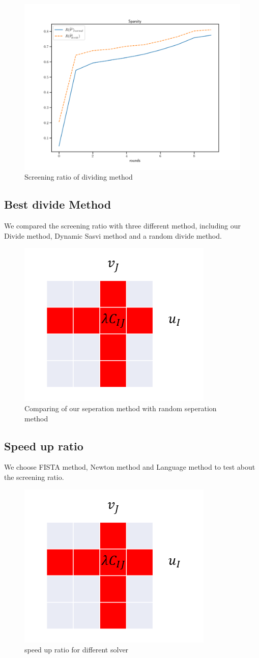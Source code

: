 	\begin{figure}[htbp]
	\begin{center}	
	\includegraphics[width=0.4\hsize]{pic/screening_divide_ratio_long}
	\caption{Screening ratio of dividing method}
	\end{center}	
	\end{figure}

\subsection{Best divide Method}
We compared the screening ratio with three different method, including our Divide method, Dynamic Sasvi method and a random divide method.
	\begin{figure}[htbp]
	\begin{center}	
	\includegraphics[width=0.4\hsize]{pic/divide}
	\caption{Comparing of our seperation method with random seperation method}
	\end{center}	
	\end{figure}

\subsection{Speed up ratio}

We choose FISTA method, Newton method and Language method to test about the screening ratio. 
	\begin{figure}[htbp]
	\begin{center}	
	\includegraphics[width=0.4\hsize]{pic/divide}
	\caption{speed up ratio for different solver}
	\end{center}	
	\end{figure}
